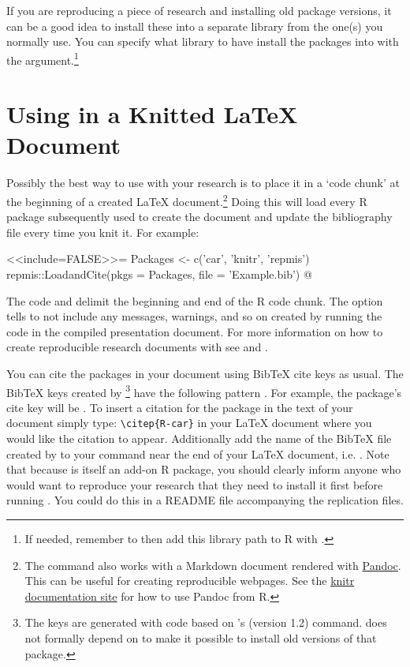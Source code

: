 If you are reproducing a piece of research and installing old package versions, it can be a good idea to install these into a separate library from the one(s) you normally use. You can specify what library to have  install the packages into with the  argument.\footnote{If needed, remember to then add this library path to R with .}

\section{Using  in a Knitted LaTeX Document}

Possibly the best way to use  with your research is to place it in a `code chunk' at the beginning of a  created LaTeX document.\footnote{The command also works with a  Markdown document rendered with \href{http://johnmacfarlane.net/pandoc/}{Pandoc}. This can be useful for creating reproducible webpages. See the \href{http://yihui.name/knitr/demo/pandoc/}{knitr documentation site} for how to use Pandoc from R.} Doing this will load every R package subsequently used to create the document and update the bibliography file every time you knit it. For example:

\begin{example}
<<include=FALSE>>=
  Packages <- c('car', 'knitr', 'repmis')
  repmis::LoadandCite(pkgs = Packages, file = 'Example.bib')
@
\end{example}

\noindent The code  and  delimit the beginning and end of the R code chunk. The  option tells  to not include any messages, warnings, and so on created by running the code in the compiled presentation document. For more information on how to create reproducible research documents with  see \cite{Xie2013} and \cite{Gandrud2013}.

You can cite the packages in your document using BibTeX cite keys as usual. The BibTeX keys created by \footnote{The keys are generated with code based on 's (version 1.2)   command.  does not formally depend on  to make it possible to install old versions of that package.} have the following pattern . For example, the  package's cite key will be . To insert a citation for the  package in the text of your document simply type: \verb|\citep{R-car}| in your LaTeX document where you would like the citation to appear. Additionally add the name of the BibTeX file created by  to your  command near the end of your LaTeX document, i.e. \verb||. Note that because  is itself an add-on R package, you should clearly inform anyone who would want to reproduce your research that they need to install it first before running . You could do this in a README file accompanying the replication files.

